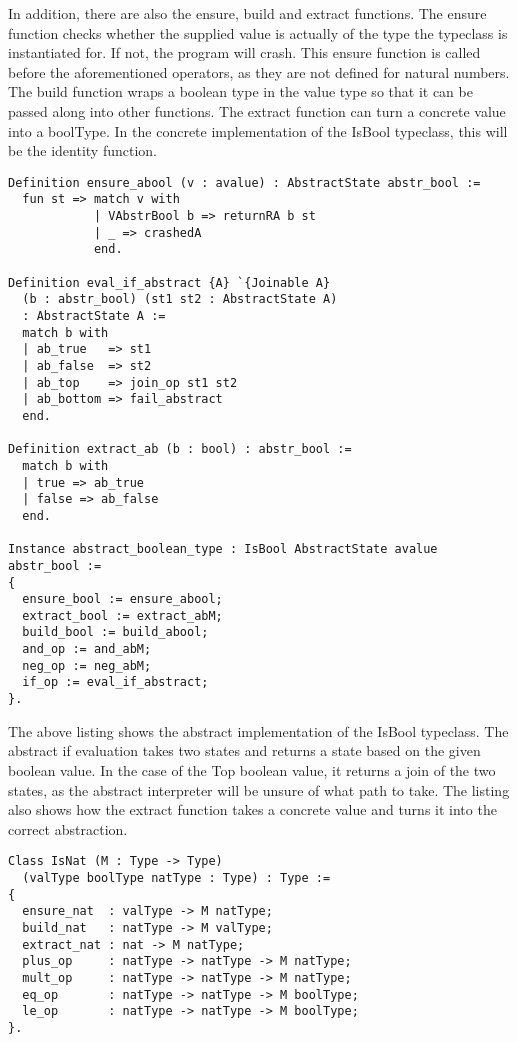 In addition, there are also the ensure, build and extract functions. The ensure
function checks whether the supplied value is actually of the type the
typeclass is instantiated for. If not, the program will crash. This ensure
function is called before the aforementioned operators, as they are not defined
for natural numbers. The build function wraps a boolean type in the value type
so that it can be passed along into other functions. The extract function can
turn a concrete value into a boolType. In the concrete implementation
of the IsBool typeclass, this will be the identity function.

\begin{verbatim}
Definition ensure_abool (v : avalue) : AbstractState abstr_bool :=
  fun st => match v with
            | VAbstrBool b => returnRA b st
            | _ => crashedA
            end.

Definition eval_if_abstract {A} `{Joinable A} 
  (b : abstr_bool) (st1 st2 : AbstractState A) 
  : AbstractState A :=
  match b with
  | ab_true   => st1
  | ab_false  => st2
  | ab_top    => join_op st1 st2
  | ab_bottom => fail_abstract
  end.

Definition extract_ab (b : bool) : abstr_bool := 
  match b with
  | true => ab_true
  | false => ab_false
  end.

Instance abstract_boolean_type : IsBool AbstractState avalue abstr_bool :=
{
  ensure_bool := ensure_abool;
  extract_bool := extract_abM;
  build_bool := build_abool;
  and_op := and_abM;
  neg_op := neg_abM;
  if_op := eval_if_abstract;
}.
\end{verbatim}

The above listing shows the abstract implementation of the IsBool typeclass.
The abstract if evaluation takes two states and returns a state based on the
given boolean value. In the case of the Top boolean value, it returns a join of
the two states, as the abstract interpreter will be unsure of what path to
take. The listing also shows how the extract function takes a concrete value
and turns it into the correct abstraction.

\begin{verbatim}
Class IsNat (M : Type -> Type)
  (valType boolType natType : Type) : Type :=
{
  ensure_nat  : valType -> M natType;
  build_nat   : natType -> M valType;
  extract_nat : nat -> M natType;
  plus_op     : natType -> natType -> M natType;
  mult_op     : natType -> natType -> M natType;
  eq_op       : natType -> natType -> M boolType;
  le_op       : natType -> natType -> M boolType;
}.
\end{verbatim}

